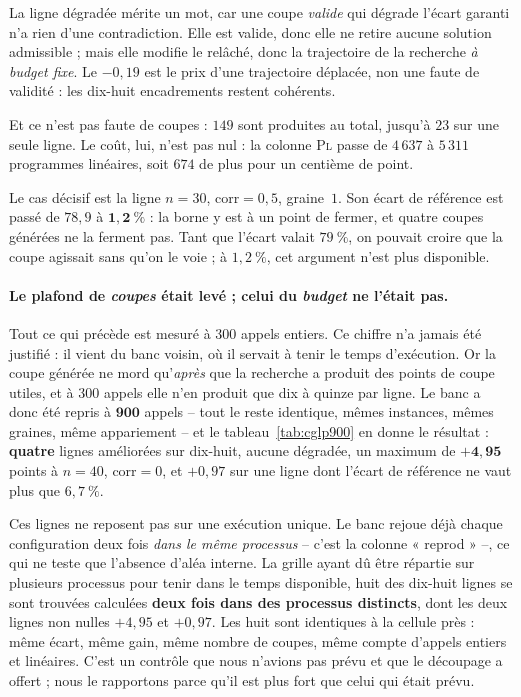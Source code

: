 \documentclass[11pt,a4paper]{article}
\theoremstyle{plain}
\theoremstyle{remark}
\begin{document}
\noindent
La ligne dégradée mérite un mot, car une coupe \emph{valide} qui dégrade
l'écart garanti n'a rien d'une contradiction. Elle est valide, donc elle ne
retire aucune solution admissible ; mais elle modifie le relâché, donc la
trajectoire de la recherche \emph{à budget fixe}. Le $-0{,}19$ est le prix
d'une trajectoire déplacée, non une faute de validité : les dix-huit
encadrements restent cohérents.

Et ce n'est pas faute de coupes : \textbf{$149$} sont produites au total,
jusqu'à $23$ sur une seule ligne. Le coût, lui, n'est pas nul : la colonne
\textsc{Pl} passe de $4\,637$ à $5\,311$ programmes linéaires, soit $674$ de
plus pour un centième de point.

Le cas décisif est la ligne $n=30$, $\text{corr}=0{,}5$, graine~$1$. Son
écart de référence est passé de $78{,}9$ à $\mathbf{1{,}2\ \%}$ : la borne
y est à un point de fermer, et quatre coupes générées ne la ferment pas.
Tant que l'écart valait $79\ \%$, on pouvait croire que la coupe agissait
sans qu'on le voie ; à $1{,}2\ \%$, cet argument n'est plus disponible.

\paragraph{Le plafond de \emph{coupes} était levé ; celui du \emph{budget}
ne l'était pas.} Tout ce qui précède est mesuré à $300$ appels entiers. Ce
chiffre n'a jamais été justifié : il vient du banc voisin, où il servait à
tenir le temps d'exécution. Or la coupe générée ne mord qu'\emph{après} que
la recherche a produit des points de coupe utiles, et à $300$ appels elle
n'en produit que dix à quinze par ligne. Le banc a donc été repris à
$\mathbf{900}$ appels -- tout le reste identique, mêmes instances, mêmes
graines, même appariement -- et le tableau~\ref{tab:cglp900} en donne le
résultat : \textbf{quatre} lignes améliorées sur dix-huit, aucune dégradée,
un maximum de $\mathbf{+4{,}95}$ points à $n=40$, $\text{corr}=0$, et
$+0{,}97$ sur une ligne dont l'écart de référence ne vaut plus que
$6{,}7\ \%$.

Ces lignes ne reposent pas sur une exécution unique. Le banc rejoue déjà
chaque configuration deux fois \emph{dans le même processus} -- c'est la
colonne « reprod » --, ce qui ne teste que l'absence d'aléa interne. La
grille ayant dû être répartie sur plusieurs processus pour tenir dans le
temps disponible, huit des dix-huit lignes se sont trouvées calculées
\textbf{deux fois dans des processus distincts}, dont les deux lignes non
nulles $+4{,}95$ et $+0{,}97$. Les huit sont identiques à la cellule près :
même écart, même gain, même nombre de coupes, même compte d'appels entiers
et linéaires. C'est un contrôle que nous n'avions pas prévu et que le
découpage a offert ; nous le rapportons parce qu'il est plus fort que celui
qui était prévu.
\end{document}
